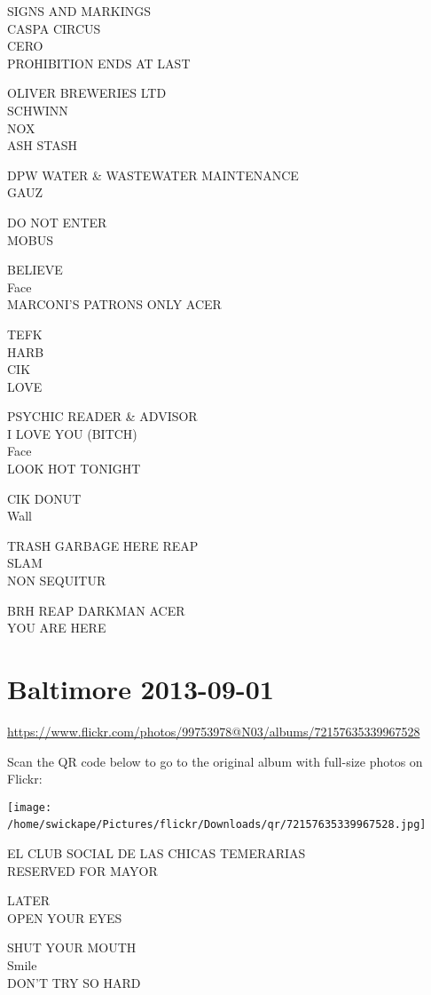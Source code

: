\documentclass[10pt,letterpaper]{article}
\begin{document}
SIGNS AND MARKINGS\\
CASPA CIRCUS\\
CERO\\
PROHIBITION ENDS AT LAST

OLIVER BREWERIES LTD\\
SCHWINN\\
NOX\\
ASH STASH

DPW WATER \& WASTEWATER MAINTENANCE\\
GAUZ

DO NOT ENTER\\
MOBUS

BELIEVE\\
Face\\
MARCONI'S PATRONS ONLY ACER

TEFK\\
HARB\\
CIK\\
LOVE

PSYCHIC READER \& ADVISOR\\
I LOVE YOU (BITCH)\\
Face\\
LOOK HOT TONIGHT

CIK DONUT\\
Wall

TRASH GARBAGE HERE REAP\\
SLAM\\
NON SEQUITUR

BRH REAP DARKMAN ACER\\
YOU ARE HERE
\

\section*{Baltimore 2013-09-01}

\url{https://www.flickr.com/photos/99753978@N03/albums/72157635339967528}

Scan the QR code below to go to the original album with full-size photos on Flickr:

\texttt{[image: /home/swickape/Pictures/flickr/Downloads/qr/72157635339967528.jpg]}
\

EL CLUB SOCIAL DE LAS CHICAS TEMERARIAS\\
RESERVED FOR MAYOR

LATER\\
OPEN YOUR EYES

SHUT YOUR MOUTH\\
Smile\\
DON'T TRY SO HARD
\end{document}
